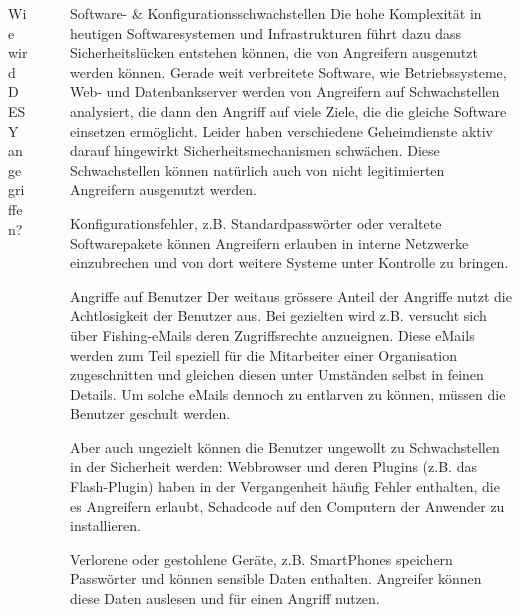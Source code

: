\documentclass[final]{beamer}
\newlength{\sepwid}
\newlength{\twocolwid}
\begin{document}
\begin{frame}[t]
\begin{columns}[t]
\begin{column}{\twocolwid}
\begin{block}{Wie wird DESY angegriffen?}
\end{block}


\end{column} %

\begin{column}{\sepwid}\end{column} %

\begin{column}{\twocolwid} %

\begin{block}{Software- \& Konfigurationsschwachstellen}
 Die hohe Komplexität in heutigen Softwaresystemen und Infrastrukturen führt dazu dass
 Sicherheitslücken entstehen können, die von Angreifern ausgenutzt werden können. 
 Gerade weit verbreitete Software, wie Betriebssysteme, Web- und Datenbankserver werden 
 von Angreifern auf Schwachstellen analysiert, die dann den Angriff auf viele Ziele, 
 die die gleiche Software einsetzen ermöglicht. Leider haben verschiedene Geheimdienste
 aktiv darauf hingewirkt Sicherheitsmechanismen schwächen. Diese Schwachstellen können
 natürlich auch von nicht legitimierten Angreifern ausgenutzt werden.
 \par
 Konfigurationsfehler, z.B. Standardpasswörter oder veraltete Softwarepakete können
 Angreifern erlauben in interne Netzwerke einzubrechen und von dort weitere Systeme 
 unter Kontrolle zu bringen.
\end{block}

\begin{block}{Angriffe auf Benutzer}
 Der weitaus grössere Anteil der Angriffe nutzt die Achtlosigkeit der Benutzer aus. 
 Bei gezielten wird z.B. versucht sich über Fishing-eMails deren Zugriffsrechte anzueignen. 
 Diese eMails werden zum Teil speziell für die Mitarbeiter einer Organisation zugeschnitten 
 und gleichen diesen unter Umständen selbst in feinen Details. Um solche eMails dennoch zu 
 entlarven zu können, müssen die Benutzer geschult werden.
 \par
 Aber auch ungezielt können die Benutzer ungewollt zu Schwachstellen in der Sicherheit werden:
 Webbrowser und deren Plugins (z.B. das Flash-Plugin) haben in der Vergangenheit häufig
 Fehler enthalten, die es Angreifern erlaubt, Schadcode auf den Computern der Anwender zu 
 installieren.
 \par
 Verlorene oder gestohlene Geräte, z.B. SmartPhones speichern Passwörter und können sensible 
 Daten enthalten. Angreifer können diese Daten auslesen und für einen Angriff nutzen.
\end{block}


\end{column}
\end{columns}
\end{frame}
\end{document}
